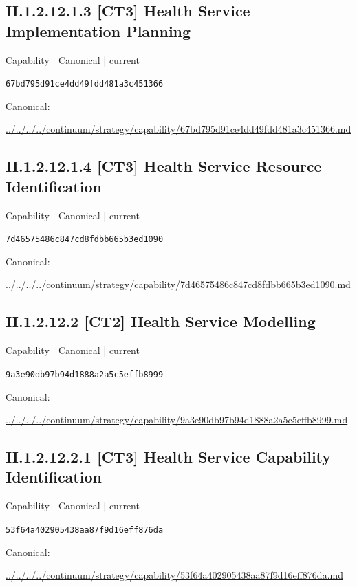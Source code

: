 \documentclass[10pt,a4paper]{article}
\begin{document}
\subsection*{II.1.2.12.1.3 [CT3] Health Service Implementation Planning}
\label{element-67bd795d91ce4dd49fdd481a3c451366}
{\small Capability | Canonical | current}\par
\texttt{67bd795d91ce4dd49fdd481a3c451366}\par
Canonical: \par
{\footnotesize\url{../../../../continuum/strategy/capability/67bd795d91ce4dd49fdd481a3c451366.md}}\par
\subsection*{II.1.2.12.1.4 [CT3] Health Service Resource Identification}
\label{element-7d46575486c847cd8fdbb665b3ed1090}
{\small Capability | Canonical | current}\par
\texttt{7d46575486c847cd8fdbb665b3ed1090}\par
Canonical: \par
{\footnotesize\url{../../../../continuum/strategy/capability/7d46575486c847cd8fdbb665b3ed1090.md}}\par
\subsection*{II.1.2.12.2 [CT2] Health Service Modelling}
\label{element-9a3e90db97b94d1888a2a5c5effb8999}
{\small Capability | Canonical | current}\par
\texttt{9a3e90db97b94d1888a2a5c5effb8999}\par
Canonical: \par
{\footnotesize\url{../../../../continuum/strategy/capability/9a3e90db97b94d1888a2a5c5effb8999.md}}\par
\subsection*{II.1.2.12.2.1 [CT3] Health Service Capability Identification}
\label{element-53f64a402905438aa87f9d16eff876da}
{\small Capability | Canonical | current}\par
\texttt{53f64a402905438aa87f9d16eff876da}\par
Canonical: \par
{\footnotesize\url{../../../../continuum/strategy/capability/53f64a402905438aa87f9d16eff876da.md}}\par
\end{document}
